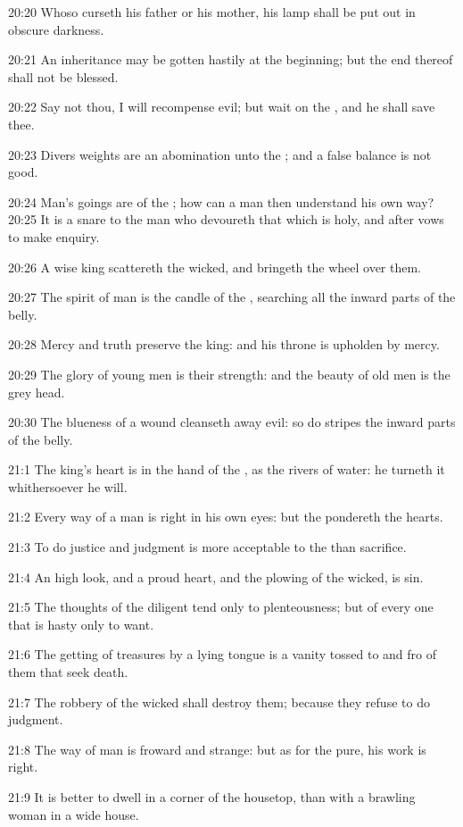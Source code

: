 20:20 Whoso curseth his father or his mother, his lamp shall be put
out in obscure darkness.

20:21 An inheritance may be gotten hastily at the beginning; but the
end thereof shall not be blessed.

20:22 Say not thou, I will recompense evil; but wait on the \LORD, and
he shall save thee.

20:23 Divers weights are an abomination unto the \LORD; and a false
balance is not good.

20:24 Man's goings are of the \LORD; how can a man then understand his
own way?  20:25 It is a snare to the man who devoureth that which is
holy, and after vows to make enquiry.

20:26 A wise king scattereth the wicked, and bringeth the wheel over
them.

20:27 The spirit of man is the candle of the \LORD, searching all the
inward parts of the belly.

20:28 Mercy and truth preserve the king: and his throne is upholden by
mercy.

20:29 The glory of young men is their strength: and the beauty of old
men is the grey head.

20:30 The blueness of a wound cleanseth away evil: so do stripes the
inward parts of the belly.

21:1 The king's heart is in the hand of the \LORD, as the rivers of
water: he turneth it whithersoever he will.

21:2 Every way of a man is right in his own eyes: but the \LORD
pondereth the hearts.

21:3 To do justice and judgment is more acceptable to the \LORD than
sacrifice.

21:4 An high look, and a proud heart, and the plowing of the wicked,
is sin.

21:5 The thoughts of the diligent tend only to plenteousness; but of
every one that is hasty only to want.

21:6 The getting of treasures by a lying tongue is a vanity tossed to
and fro of them that seek death.

21:7 The robbery of the wicked shall destroy them; because they refuse
to do judgment.

21:8 The way of man is froward and strange: but as for the pure, his
work is right.

21:9 It is better to dwell in a corner of the housetop, than with a
brawling woman in a wide house.


